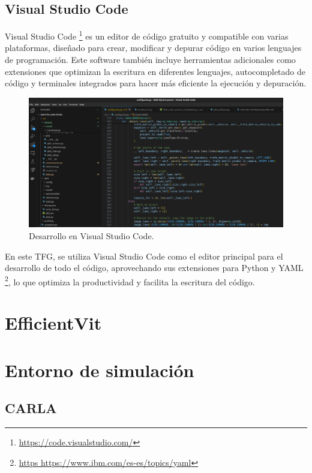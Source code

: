 \subsection{Visual Studio Code}
\label{sec:vs_code}

Visual Studio Code \footnote{\url{https://code.visualstudio.com/}} es un editor de código gratuito y compatible con varias plataformas, diseñado para crear, modificar y depurar código en varios lenguajes de programación. Este software también incluye herramientas adicionales como extensiones que optimizan la escritura en diferentes lenguajes, autocompletado de código y terminales integrados para hacer más eficiente la ejecución y depuración.

\begin{figure}[ht]
  \begin{center}
    \includegraphics[width=12cm]{figs/Plataformas_Desarollo/visual_code.png}
  \end{center}
  \caption{Desarrollo en Visual Studio Code.}
  \label{foto_code}
\end{figure}

En este \ac{TFG}, se utiliza Visual Studio Code como el editor principal para el desarrollo de todo el código, aprovechando sus extensiones para Python y YAML \footnote{\url{https https://www.ibm.com/es-es/topics/yaml}}, lo que optimiza la productividad y facilita la escritura del código.

\section{EfficientVit}
\label{sec:ef}

\section{Entorno de simulación}
\label{sec:sim}
\subsection{CARLA}
\label{sec:carls}

